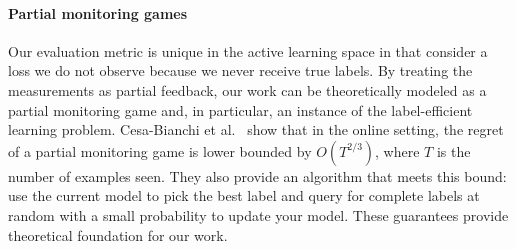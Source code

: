 \paragraph{Partial monitoring games}
Our evaluation metric is unique in the active learning space in that consider a loss we do not observe because we never receive true labels.
By treating the measurements as partial feedback, our work can be theoretically modeled as a partial monitoring game\cite{cesabianchi06regret} and, in particular, an instance of the label-efficient learning problem\cite{cesabianchi05minimizing}.
Cesa-Bianchi et al.~\cite{cesabianchi06regret} show that in the online setting, the regret of a partial monitoring game is lower bounded by $O(T^{2/3})$, where $T$ is the number of examples seen. They also provide an algorithm that meets this bound: use the current model to pick the best label and query for complete labels at random with a small probability to update your model.
These guarantees provide theoretical foundation for our work.
